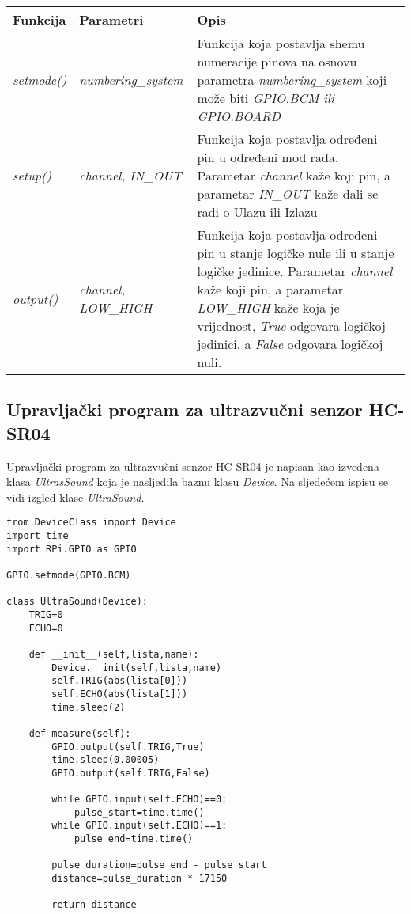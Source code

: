 \begin{center}
    \begin{tabular}{ | l | l | p{5cm} |}
    \hline
    Funkcija & Parametri & Opis \\ \hline
    \textit{setmode()} &\textit{numbering\_system} &Funkcija koja postavlja shemu numeracije pinova na osnovu parametra \textit{numbering\_system} koji može biti \textit{GPIO.BCM ili GPIO.BOARD}\\
    \hline
    \textit{setup()} &\textit{channel, IN\_OUT} &Funkcija koja postavlja određeni pin u određeni mod rada. Parametar \textit{channel} kaže koji pin, a parametar \textit{IN\_OUT} kaže dali se radi o Ulazu ili Izlazu\\
    \hline
    \textit{output()} &\textit{channel, LOW\_HIGH} &Funkcija koja postavlja određeni pin u stanje logičke nule ili u stanje logičke jedinice. Parametar \textit{channel} kaže koji pin, a parametar \textit{LOW\_HIGH} kaže koja je vrijednost, \textit{True} odgovara logičkoj jedinici, a \textit{False} odgovara logičkoj nuli.\\
    \hline
    \end{tabular}
\end{center}

\newpage
\subsection{Upravljački program za ultrazvučni senzor HC-SR04}
Upravljački program za ultrazvučni senzor HC-SR04 je napisan kao izvedena klasa \textit{UltrasSound} koja je nasljedila baznu klasu \textit{Device}. Na sljedećem ispisu se vidi izgled klase \textit{UltraSound}.

\begin{lstlisting}[caption={Klasa \textit{UltraSound}  (\textit{Raspberry Pi})}, xleftmargin=.75in, label=program]
from DeviceClass import Device
import time
import RPi.GPIO as GPIO

GPIO.setmode(GPIO.BCM)

class UltraSound(Device):
	TRIG=0
	ECHO=0
	
	def __init__(self,lista,name):
		Device.__init(self,lista,name)
		self.TRIG(abs(lista[0]))
		self.ECHO(abs(lista[1]))
		time.sleep(2)
	
	def measure(self):
		GPIO.output(self.TRIG,True)
		time.sleep(0.00005)
		GPIO.output(self.TRIG,False)
	
		while GPIO.input(self.ECHO)==0:
			pulse_start=time.time()
		while GPIO.input(self.ECHO)==1:
			pulse_end=time.time()

		pulse_duration=pulse_end - pulse_start
		distance=pulse_duration * 17150
	
		return distance
\end{lstlisting}

